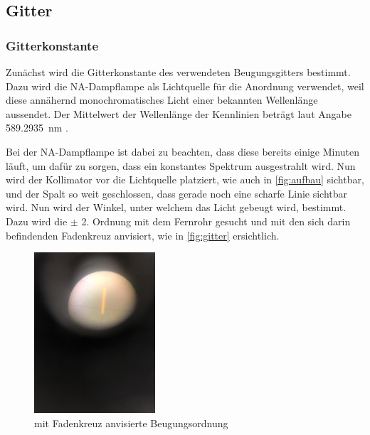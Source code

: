 \documentclass[11pt,ngerman]{scrartcl}
\begin{document}
\subsection{Gitter}

\subsubsection{Gitterkonstante}

Zunächst wird die Gitterkonstante des verwendeten Beugungsgitters bestimmt. Dazu wird die NA-Dampflampe als Lichtquelle für die Anordnung verwendet, weil diese annähernd monochromatisches Licht einer bekannten Wellenlänge aussendet. Der Mittelwert der Wellenlänge der Kennlinien beträgt laut Angabe \SI{589.2935}{\nm} \cite{gitterprismavorlage}.

\vspace{2mm}

Bei der NA-Dampflampe ist dabei zu beachten, dass diese bereits einige Minuten läuft, um dafür zu sorgen, dass ein konstantes Spektrum ausgestrahlt wird. Nun wird der Kollimator vor die Lichtquelle platziert, wie auch in \autoref{fig:aufbau} sichtbar, und der Spalt so weit geschlossen, dass gerade noch eine scharfe Linie sichtbar wird. Nun wird der Winkel, unter welchem das Licht gebeugt wird, bestimmt. Dazu wird die $\pm$ 2. Ordnung mit dem Fernrohr gesucht und mit den sich darin befindenden Fadenkreuz anvisiert, wie in \autoref{fig:gitter} ersichtlich.

\begin{figure}[H]
	\begin{center}
		\includegraphics[angle=-90,width=0.4\textwidth]{gitter}
	\end{center}
	\caption{mit Fadenkreuz anvisierte Beugungsordnung}
	\label{fig:gitter}
\end{figure}
\end{document}
